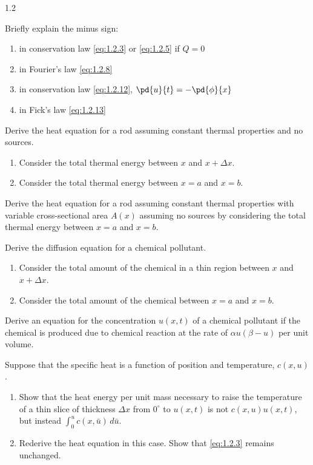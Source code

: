 \begin{exercises}{1.2}

\item Briefly explain the minus sign:
\begin{enumerate}
\item[(a)] in conservation law \eqref{eq:1.2.3} or \eqref{eq:1.2.5} if $Q = 0$
\item[(b)] in Fourier's law \eqref{eq:1.2.8}
\item[(c)] in conservation law \eqref{eq:1.2.12}, $\pd{u}{t} = -\pd{\phi}{x}$
\item[(d)] in Fick's law \eqref{eq:1.2.13}
\end{enumerate}

\item Derive the heat equation for a rod assuming constant thermal properties and no sources.
\begin{enumerate}
\item[(a)] Consider the total thermal energy between $x$ and $x + \Delta x$.
\item[(b)] Consider the total thermal energy between $x = a$ and $x = b$.
\end{enumerate}

\item Derive the heat equation for a rod assuming constant thermal properties with variable cross-sectional area $A(x)$ assuming no sources by considering the total thermal energy between $x = a$ and $x = b$.

\item Derive the diffusion equation for a chemical pollutant.
\begin{enumerate}
\item[(a)] Consider the total amount of the chemical in a thin region between $x$ and $x + \Delta x$.
\item[(b)] Consider the total amount of the chemical between $x = a$ and $x = b$.
\end{enumerate}

\item Derive an equation for the concentration $u(x,t)$ of a chemical pollutant if the chemical is produced due to chemical reaction at the rate of $\alpha u(\beta - u)$ per unit volume.

\item Suppose that the specific heat is a function of position and temperature, $c(x, u)$.
\begin{enumerate}
\item[(a)] Show that the heat energy per unit mass necessary to raise the temperature of a thin slice of thickness $\Delta x$ from $0^\circ$ to $u(x,t)$ is not $c(x, u) u(x,t)$, but instead $\int_0^u c(x, \bar{u})\,d\bar{u}$.
\item[(b)] Rederive the heat equation in this case. Show that \eqref{eq:1.2.3} remains unchanged.
\end{enumerate}


\end{exercises}
